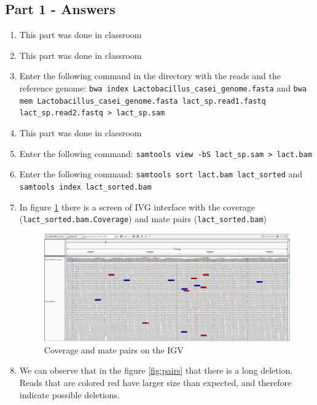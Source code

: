 \subsection{Part 1 - Answers}
\begin{enumerate}
  \item This part was done in classroom
  \item This part was done in classroom
  \item Enter the following command in the directory with the reads and the
reference genome: \texttt{bwa index Lactobacillus\_casei\_genome.fasta} and
\texttt{bwa mem Lactobacillus\_casei\_genome.fasta lact\_sp.read1.fastq 
lact\_sp.read2.fastq > lact\_sp.sam}
  \item This part was done in classroom
  \item Enter the following command:
\texttt{samtools view -bS lact\_sp.sam > lact.bam}
  \item Enter the following command:
\texttt{samtools sort lact.bam lact\_sorted} and
\texttt{samtools index lact\_sorted.bam}
  \item In figure \ref{fig:coverage_matepairs} there is a screen of IVG
interface with the coverage (\texttt{lact\_sorted.bam.Coverage}) and mate pairs
(\texttt{lact\_sorted.bam})

\begin{figure}[h]
  \centering
  \includegraphics[scale=0.2]{img/coverage_matepairs}
  \caption{Coverage and mate pairs on the IGV}
  \label{fig:coverage_matepairs}
\end{figure}

  \item We can observe that in the figure \ref{fig:pairs} that there is a long
deletion. Reads that are colored red have larger size than expected, 
and therefore indicate possible deletions.


\end{enumerate}
